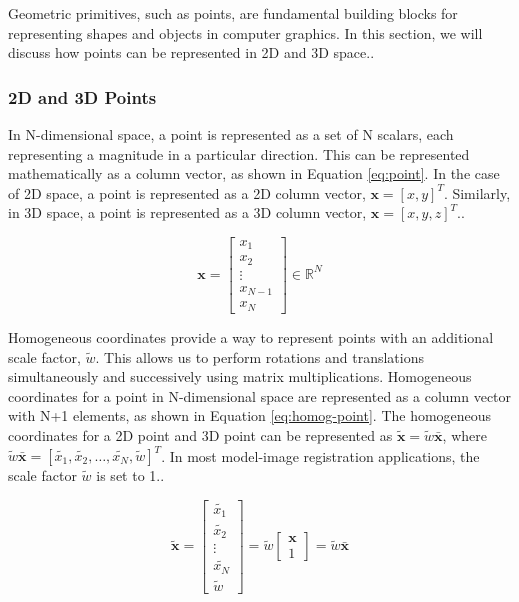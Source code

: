 Geometric primitives, such as points, are fundamental building blocks for representing shapes and objects in computer graphics. In this section, we will discuss how points can be represented in 2D and 3D space..

\subsubsection{2D and 3D Points}
\label{sec:geometric-points}
In N-dimensional space, a point is represented as a set of N scalars, each representing a magnitude in a particular direction. This can be represented mathematically as a column vector, as shown in Equation \ref{eq:point}. In the case of 2D space, a point is represented as a 2D column vector, $\mathbf{x} = [x , y]^{T}$. Similarly, in 3D space, a point is represented as a 3D column vector, $\mathbf{x} = [x , y , z]^{T}$..

\begin{equation}
    \mathbf{x} = \begin{bmatrix}
        x_1 \\ x_2 \\ \vdots \\ x_{N-1} \\ x_N
    \end{bmatrix} \in \mathbb{R}^N
    \label{eq:point}
\end{equation}

Homogeneous coordinates provide a way to represent points with an additional scale factor, $\tilde{w}$. This allows us to perform rotations and translations simultaneously and successively using matrix multiplications. Homogeneous coordinates for a point in N-dimensional space are represented as a column vector with N+1 elements, as shown in Equation \ref{eq:homog-point}. The homogeneous coordinates for a 2D point and 3D point can be represented as $\tilde{\mathbf{x}} = \tilde{w}\bar{\mathbf{x}}$, where $\tilde{w}\bar{\mathbf{x}} = [\tilde{x_1} , \tilde{x_2}, \dots, \tilde{x_N} , \tilde{w}]^{T}$. In most model-image registration applications, the scale factor $\tilde{w}$ is set to 1..

\begin{equation}
    \tilde{\mathbf{x}} = \begin{bmatrix}
        \tilde{x_1} \\ \tilde{x_2} \\ \vdots \\ \tilde{x_N} \\ \tilde{w}
    \end{bmatrix} = \tilde{w}\begin{bmatrix}
        \mathbf{x}\\ 1
    \end{bmatrix} = \tilde{w}\bar{\mathbf{x}}
    \label{eq:homog-point}
\end{equation}

